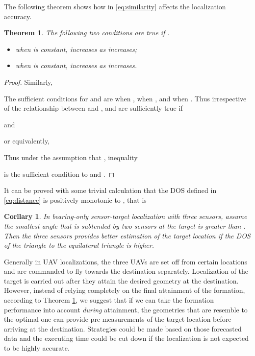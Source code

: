 \documentclass[times]{rncauth}
\newtheorem{thm}{Theorem}[section]
\newtheorem{cor}{Corllary}[section]
\begin{document}
The following theorem shows how  in \eqref{eq:similarity}
affects the localization accuracy.
\begin{thm}\label{thm:estimation_opt}
The following two conditions are true if
.
\begin{itemize}
\item[i).] when  is constant, 
increases as  increases;
\item[ii).] when  is constant,  increases as
 increases.
\end{itemize}

\end{thm}
\begin{proof}

Similarly,

The sufficient conditions  for  and  are
 when
,
 when
, and  when
. Thus irrespective of the relationship
between  and ,  and  are
sufficiently true if

and

or equivalently,

Thus under the assumption that
, inequality

is the sufficient condition to  and .
\end{proof}
It can be proved with some trivial calculation that the DOS
defined in \eqref{eq:distance} is positively monotonic to ,
that is
\begin{cor}\label{cor:similarity}
  In bearing-only sensor-target localization with three sensors, assume the smallest angle that is
  subtended by two sensors
  at the target is greater than .  Then the three
  sensors provides better estimation of the target location if the DOS of the triangle to the
   equilateral triangle is higher.
\end{cor}

Generally in UAV localizations, the three UAVs are set off from
certain locations and are commanded to fly towards the destination
separately. Localization of the target is carried out after they
attain the desired geometry at the destination. However, instead of
relying completely on the final attainment of the formation,
according to Theorem \ref{thm:estimation_opt}, we suggest that if we
can take the formation performance  into
account \emph{during} attainment, the geometries that are resemble to
the optimal one can provide pre-measurements of the target location
before arriving at the destination. Strategies could be made based
on those forecasted data and the executing time could be cut down if
the localization is not expected to be highly accurate.
\end{document}
